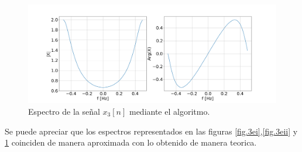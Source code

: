 \documentclass[letterpaper]{article}
\begin{document}
    \begin{figure}[H]
    \centering
    \includegraphics[width=\textwidth]{Img/punto_3_e_3.png}
    \caption{Espectro de la señal $x_{3}[n]$ mediante el algoritmo.}
    \label{fig.3eiii}
    \end{figure}

    Se puede apreciar que los espectros representados en las figuras \ref{fig.3ei},\ref{fig.3eii} y \ref{fig.3eiii} coinciden de manera aproximada con lo obtenido de manera teorica. 
\end{document}

